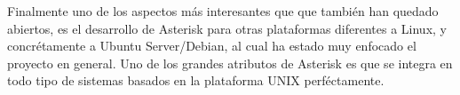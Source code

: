 Finalmente uno de los aspectos más interesantes que que también han quedado abiertos, es el desarrollo de Asterisk para otras plataformas diferentes a Linux, y concrétamente a Ubuntu Server/Debian, al cual ha estado muy enfocado el proyecto en general. Uno de los grandes atributos de Asterisk es que se integra en todo tipo de sistemas basados en la plataforma UNIX perféctamente.